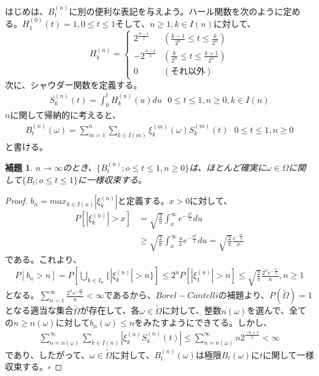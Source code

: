\documentclass[12pt]{jarticle}
\newtheorem{lemma}[theorem]{補題}
\def\qed{{\hfill$\square$}}
\begin{document}
はじめは、$B^{(n)}_t$に別の便利な表記を与えよう。ハール関数を次のように定める。$H^{(0)}_1 (t) = 1,0\leq t \leq 1そして、n\geq 1,k\in I(n)$に対して、\\
\begin{equation}
\displaystyle H^{(n)}_k = \left\{
\begin{array}{lll}
\displaystyle
2^{\frac{n -1}{2}} & (\frac{k-1}{2^n} \leq t \leq \frac{k}{2^n})\\
-2^{\frac{n -1}{2}} & (\frac{k}{2^n} \leq t \leq \frac{k + 1}{2^n})\\
0 & (それ以外) \tag{6}
\end{array}
\right.
\end{equation}次に、シャウダー関数を定義する。
\begin{align*}
  \label{07}
  \displaystyle S^{(n)}_k (t) = \int^{t}_0 H^{(n)}_k (u) du \ \ \ 0\leq t \leq 1,n\geq 0,k\in I(n)
  \tag{7}
\end{align*}
$n$に関して帰納的に考えると、
\begin{align*}
  \label{08}
  \displaystyle B^{(n)}_t (\omega) = \sum^{n}_{m = 1} \sum_{k \in I(m)} \xi^{(m)}_k (\omega) S^{(m)}_k (t)\ \ \ 0\leq t \leq 1,n\geq 0
  \tag{8}
\end{align*}
と書ける。
\begin{lemma}
  $n \rightarrow \infty$のとき、$\{B^{(n)}_t;o\leq t \leq 1,n\geq 0\}$は、ほとんど確実に$\omega \in \Omega$に関して$\{B_t;o\leq t \leq 1\}$に一様収束する。
\end{lemma}
\begin{proof}
  $b_n = max_{k \in I(n)} |\xi^{(n)}_k|$と定義する。$x > 0$に対して、
  \begin{align*}
    \label{09}
    \displaystyle P[|\xi^{(n)}_k| > x] &= \sqrt{\frac{2}{\pi}}\int^{\infty}_x e^{-\frac{u^2}{2}}du \\
    &\geq \sqrt{\frac{2}{\pi}}\int^{\infty}_x \frac{u}{x}e^{-\frac{u^2}{2}}du = \sqrt{\frac{2}{\pi}} \frac{e^{-\frac{x^2}{2}}}{x}
    \tag{9}
  \end{align*}
  である。これより、
\begin{align}
  \label{10}
  \displaystyle
  P[b_n>n] = P[\bigcup_{k \in I_n}{\{|\xi^{(n)}_k| > n\}}] \leq 2^n P[|\xi^{(n)}_1| > n] \leq \sqrt{\frac{2}{\pi}} \frac{2^n e^{-\frac{n^2}{2}}}{n},n\geq 1
  \tag{10}
\end{align}となる。$\sum^{\infty}_{n = 1} \frac{2^n e^{-\frac{n^2}{2}}}{n} < \infty$であるから、$Borel-Cantelli$の補題より、$P(\tilde{\Omega}) = 1$となる適当な集合$\tilde{\Omega}$が存在して、各$\omega \in \tilde{\Omega}$に対して、整数$n(\omega)$を選んで、全ての$n \geq n(\omega)$に対して$b_n (\omega) \leq n$をみたすようにできてる。しかし、
\begin{align}
  \label{11}
  \displaystyle
  \sum^{\infty}_{n = n(\omega)} \sum_{k \in I(n)} |\xi^{(n)}_k S^{(n)}_k (t)|\leq \sum^{\infty}_{n = n(\omega)} n 2^{\frac{-n+1}{2}} < \infty
  \tag{11}
\end{align}であり、したがって、$\omega \in \tilde{\Omega}$に対して、$B^{(n)}_t (\omega)$は極限$B_t (\omega)$に$t$に関して一様収束する。\qed
\end{proof}
\end{document}
